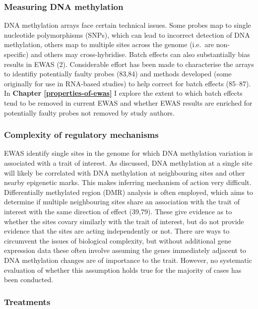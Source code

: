 \documentclass[11pt,oneside]{bristolthesis}
\begin{document}
\hypertarget{measuring-dna-methylation}{%
\subsubsection{Measuring DNA methylation}\label{measuring-dna-methylation}}

DNA methylation arrays face certain technical issues. Some probes map to single nucleotide polymorphisms (SNPs), which can lead to incorrect detection of DNA methylation, others map to multiple sites across the genome (i.e.~are non-specific) and others may cross-hybridise. Batch effects can also substantially bias results in EWAS (2). Considerable effort has been made to characterise the arrays to identifiy potentially faulty probes (83,84) and methods developed (some originally for use in RNA-based studies) to help correct for batch effects (85--87). In \textbf{Chapter \ref{properties-of-ewas}} I explore the extent to which batch effects tend to be removed in current EWAS and whether EWAS results are enriched for potentially faulty probes not removed by study authors.

\hypertarget{complexity-of-regulatory-mechanisms}{%
\subsubsection{Complexity of regulatory mechanisms}\label{complexity-of-regulatory-mechanisms}}

EWAS identify single sites in the genome for which DNA methylation variation is associated with a trait of interest. As discussed, DNA methylation at a single site will likely be correlated with DNA methylation at neighbouring sites and other nearby epigenetic marks. This makes inferring mechanism of action very difficult. Differentially methylated region (DMR) analysis is often employed, which aims to determine if multiple neighbouring sites share an association with the trait of interest with the same direction of effect (39,79). These give evidence as to whether the sites covary similarly with the trait of interest, but do not provide evidence that the sites are acting independently or not. There are ways to circumvent the issues of biological complexity, but without additional gene expression data these often involve assuming the genes immediately adjacent to DNA methylation changes are of importance to the trait. However, no systematic evaluation of whether this assumption holds true for the majority of cases has been conducted.

\hypertarget{treatments}{%
\subsubsection{Treatments}\label{treatments}}
\end{document}
